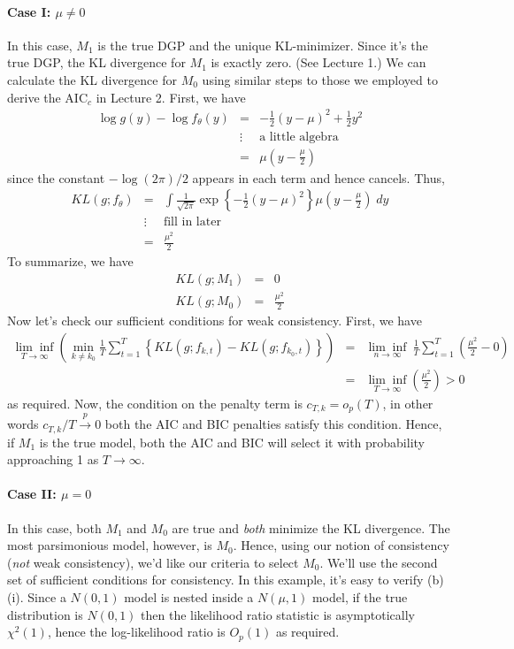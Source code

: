 \documentclass[12pt]{article}
\theoremstyle{definition}
\begin{document}
\paragraph{Case I: $\mu \neq 0$} In this case, $M_1$ is the true DGP and the unique KL-minimizer. Since it's the true DGP, the KL divergence for $M_1$ is exactly zero. (See Lecture 1.) We can calculate the KL divergence for $M_0$ using similar steps to those we employed to derive the AIC$_c$ in Lecture 2. First, we have
	\begin{eqnarray*}
		\log g(y) - \log f_\theta(y) &=& -\frac{1}{2}(y-\mu)^2 + \frac{1}{2} y^2\\
		&\vdots& \boxed{\mbox{a little algebra}}\\
		&=& \mu \left(y - \frac{\mu}{2}\right)
	\end{eqnarray*}
since the constant $-\log(2\pi)/2$ appears in each term and hence cancels. Thus,
	\begin{eqnarray*}
		KL(g;f_\theta) &=& \int \frac{1}{\sqrt{2\pi}} \exp\left\{ -\frac{1}{2} (y-\mu)^2\right\} \mu\left(y - \frac{\mu}{2} \right)\; dy\\
			&\vdots& \boxed{\mbox{fill in later}}\\
			&=& \frac{\mu^2}{2}
	\end{eqnarray*}
To summarize, we have
	\begin{eqnarray*}
		KL(g;M_1) &=&0\\
		KL(g;M_0) &=& \frac{\mu^2}{2}
	\end{eqnarray*}
Now let's check our sufficient conditions for weak consistency. First, we have
	\begin{eqnarray*}
		\underset{T\rightarrow \infty}{\lim\inf}\left(\underset{k \neq k_0}{\min} \frac{1}{T}\sum_{t = 1}^T \left\{ KL(g; f_{k,t}) - KL(g;f_{k_0,t}) \right\} \right) &=& \underset{n\rightarrow \infty}{\lim\inf}\ \frac{1}{T}\sum_{t = 1}^T  \left(\frac{\mu^2}{2} - 0\right) \\
		&=&  \underset{T\rightarrow \infty}{\lim\inf}\left(\frac{\mu^2}{2}\right) >0
	\end{eqnarray*}
as required. Now, the condition on the penalty term is $c_{T,k} = o_p(T)$, in other words $c_{T,k}/T \overset{p}{\rightarrow} 0$ both the AIC and BIC penalties satisfy this condition. Hence, if $M_1$ is the true model, both the AIC and BIC will select it with probability approaching 1 as $T\rightarrow \infty$.

\paragraph{Case II: $\mu = 0$} In this case, both $M_1$ and $M_0$ are true and \emph{both} minimize the KL divergence. The most parsimonious model, however, is $M_0$. Hence, using our notion of consistency (\emph{not} weak consistency), we'd like our criteria to select $M_0$. We'll use the second set of sufficient conditions for consistency. In this example, it's easy to verify (b)(i). Since a $N(0,1)$ model is nested inside a $N(\mu,1)$ model, if the true distribution is $N(0,1)$ then the likelihood ratio statistic is asymptotically $\chi^2(1)$, hence the log-likelihood ratio is $O_p(1)$ as required. 
\end{document}
